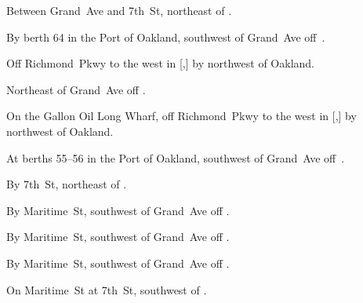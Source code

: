 
\begin{LocationList}

Between Grand~Ave and 7th~St, northeast of .

By berth 64 in the Port of Oakland, southwest of Grand~Ave off~.

Off Richmond~Pkwy to the west in [,] by  northwest of Oakland.

Northeast of Grand~Ave off .

On the Gallon Oil Long Wharf, off Richmond~Pkwy to the west in [,] by  northwest of Oakland.

At berths 55--56 in the Port of Oakland, southwest of Grand~Ave off~.

By 7th~St, northeast of .

\Location{\RecruitmentAgency \Recruitment}
By Maritime~St, southwest of Grand~Ave off .

By Maritime~St, southwest of Grand~Ave off .

\Location{\TruckService \Service}
By Maritime~St, southwest of Grand~Ave off .

\Location{\TruckStop \Gas \Rest \Weigh}
On Maritime~St at 7th~St, southwest of .

\end{LocationList}
